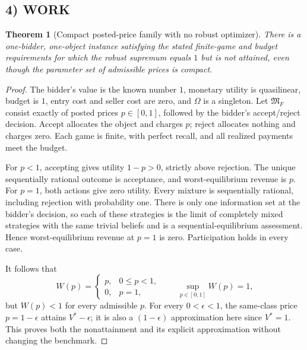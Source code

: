 \documentclass[11pt,a4paper]{article}
\newtheorem{theorem}{Theorem}
\theoremstyle{definition}
\begin{document}
\subsection*{4) WORK}
\begin{theorem}[Compact posted-price family with no robust optimizer]
There is a one-bidder, one-object instance satisfying the stated finite-game and budget requirements for which the robust supremum equals $1$ but is not attained, even though the parameter set of admissible prices is compact.
\end{theorem}
\begin{proof}
The bidder's value is the known number $1$, monetary utility is quasilinear, budget is $1$, entry cost and seller cost are zero, and $\Omega$ is a singleton. Let $\mathfrak M_F$ consist exactly of posted prices $p\in[0,1]$, followed by the bidder's accept/reject decision. Accept allocates the object and charges $p$; reject allocates nothing and charges zero. Each game is finite, with perfect recall, and all realized payments meet the budget.

For $p<1$, accepting gives utility $1-p>0$, strictly above rejection. The unique sequentially rational outcome is acceptance, and worst-equilibrium revenue is $p$. For $p=1$, both actions give zero utility. Every mixture is sequentially rational, including rejection with probability one. There is only one information set at the bidder's decision, so each of these strategies is the limit of completely mixed strategies with the same trivial beliefs and is a sequential-equilibrium assessment. Hence worst-equilibrium revenue at $p=1$ is zero. Participation holds in every case.

It follows that
\[
 W(p)=\begin{cases}p,&0\le p<1,\\0,&p=1,\end{cases}
 \qquad \sup_{p\in[0,1]}W(p)=1,
\]
but $W(p)<1$ for every admissible $p$. For every $0<\epsilon<1$, the same-class price $p=1-\epsilon$ attains $V^*-\epsilon$; it is also a $(1-\epsilon)$ approximation here since $V^*=1$. This proves both the nonattainment and its explicit approximation without changing the benchmark.
\end{proof}
\end{document}
